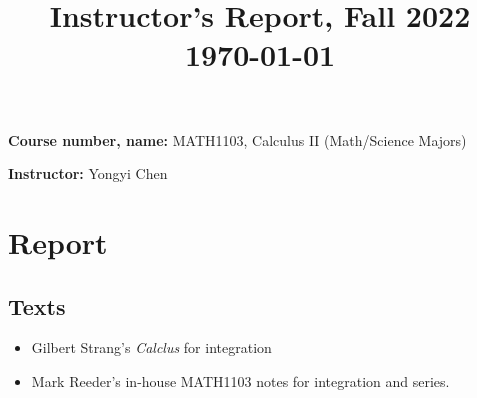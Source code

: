 \documentclass[11pt,oneside]{amsart}
\title{Instructor's Report, Fall 2022\\ \today}
\begin{document}
\maketitle

\bigskip

\textbf{Course number, name:} MATH1103, Calculus II (Math/Science Majors)

\textbf{Instructor:} Yongyi Chen

\section{Report}
\subsection{Texts}
\begin{itemize}
  \item Gilbert Strang's \emph{Calclus} for integration
  \item Mark Reeder's in-house MATH1103 notes for integration and series.
\end{itemize}
\end{document}
